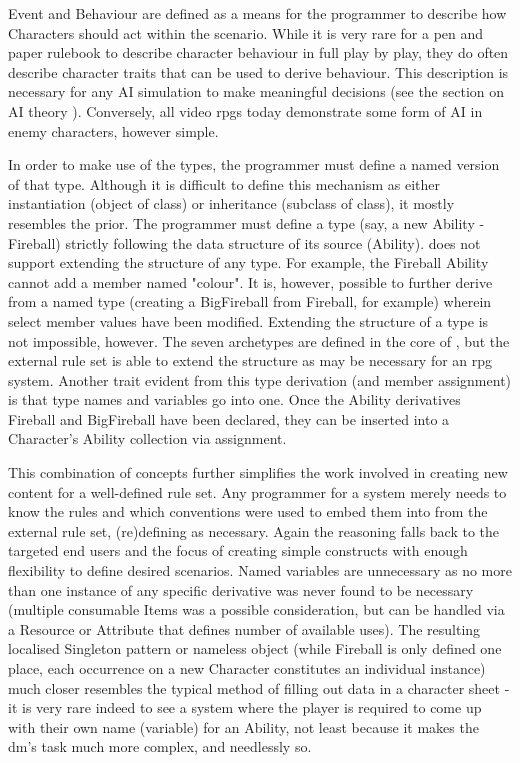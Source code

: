 Event and Behaviour are defined as a means for the programmer to describe how Characters should act within the scenario. While it is very rare for a pen and paper rulebook to describe character behaviour in full play by play, they do often describe character traits that can be used to derive behaviour. This description is necessary for any AI simulation to make meaningful decisions (see the section on AI theory ). Conversely, all video \ac{rpgs} today demonstrate some form of AI in enemy characters, however simple.

In order to make use of the types, the programmer must define a named version of that type. Although it is difficult to define this mechanism as either instantiation (object of class) or inheritance (subclass of class), it mostly resembles the prior. The programmer must define a type (say, a new Ability - Fireball) strictly following the data structure of its source (Ability). \langname{} does not support extending the structure of any type. For example, the Fireball Ability cannot add a member named "colour". It is, however, possible to further derive from a named type (creating a BigFireball from Fireball, for example) wherein select member values have been modified. Extending the structure of a type is not impossible, however. The seven archetypes are defined in the core of \langname{}, but the external rule set is able to extend the structure as may be necessary for an \ac{rpg} system. Another trait evident from this type derivation (and member assignment) is that type names and variables go into one. Once the Ability derivatives Fireball and BigFireball have been declared, they can be inserted into a Character's Ability collection via assignment.

This combination of concepts further simplifies the work involved in creating new content for a well-defined rule set. Any \langname{} programmer for a system merely needs to know the rules and which conventions were used to embed them into \langname{} from the external rule set, (re)defining as necessary. Again the reasoning falls back to the targeted end users and the focus of creating simple constructs with enough flexibility to define desired scenarios. Named variables are unnecessary as no more than one instance of any specific derivative was never found to be necessary (multiple consumable Items was a possible consideration, but can be handled via a Resource or Attribute that defines number of available uses). The resulting localised Singleton pattern or nameless object (while Fireball is only defined one place, each occurrence on a new Character constitutes an individual instance) much closer resembles the typical method of filling out data in a character sheet - it is very rare indeed to see a system where the player is required to come up with their own name (variable) for an Ability, not least because it makes the \ac{dm}'s task much more complex, and needlessly so.
